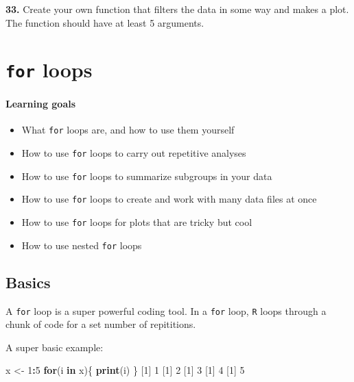 \documentclass[]{book}
\newenvironment{Shaded}{\begin{snugshade}}{\end{snugshade}}
\newcommand{\ControlFlowTok}[1]{\textcolor[rgb]{0.13,0.29,0.53}{\textbf{#1}}}
\newcommand{\DecValTok}[1]{\textcolor[rgb]{0.00,0.00,0.81}{#1}}
\newcommand{\KeywordTok}[1]{\textcolor[rgb]{0.13,0.29,0.53}{\textbf{#1}}}
\newcommand{\NormalTok}[1]{#1}
\newcommand{\OperatorTok}[1]{\textcolor[rgb]{0.81,0.36,0.00}{\textbf{#1}}}
\newcommand{\StringTok}[1]{\textcolor[rgb]{0.31,0.60,0.02}{#1}}
\providecommand{\tightlist}{%
  \setlength{\itemsep}{0pt}\setlength{\parskip}{0pt}}
\begin{document}
\textbf{33.} Create your own function that filters the data in some way and makes a plot. The function should have at least 5 arguments.

\hypertarget{for-loops}{%
\chapter{\texorpdfstring{\texttt{for} loops}{for loops}}\label{for-loops}}

\hypertarget{learning-goals-32}{%
\subsubsection*{Learning goals}\label{learning-goals-32}}

\begin{itemize}
\tightlist
\item
  What \texttt{for} loops are, and how to use them yourself\\
\item
  How to use \texttt{for} loops to carry out repetitive analyses\\
\item
  How to use \texttt{for} loops to summarize subgroups in your data\\
\item
  How to use \texttt{for} loops to create and work with many data files at once\\
\item
  How to use \texttt{for} loops for plots that are tricky but cool\\
\item
  How to use nested \texttt{for} loops
\end{itemize}

\hypertarget{basics}{%
\section*{Basics}\label{basics}}

A \texttt{for} loop is a super powerful coding tool. In a \texttt{for} loop, \texttt{R} loops through a chunk of code for a set number of repititions.

A super basic example:

\begin{Shaded}
\begin{Highlighting}[]
\NormalTok{x <-}\StringTok{ }\DecValTok{1}\OperatorTok{:}\DecValTok{5}
\ControlFlowTok{for}\NormalTok{(i }\ControlFlowTok{in}\NormalTok{ x)\{}
  \KeywordTok{print}\NormalTok{(i)}
\NormalTok{\}}
\NormalTok{[}\DecValTok{1}\NormalTok{] }\DecValTok{1}
\NormalTok{[}\DecValTok{1}\NormalTok{] }\DecValTok{2}
\NormalTok{[}\DecValTok{1}\NormalTok{] }\DecValTok{3}
\NormalTok{[}\DecValTok{1}\NormalTok{] }\DecValTok{4}
\NormalTok{[}\DecValTok{1}\NormalTok{] }\DecValTok{5}
\end{Highlighting}
\end{Shaded}
\end{document}
